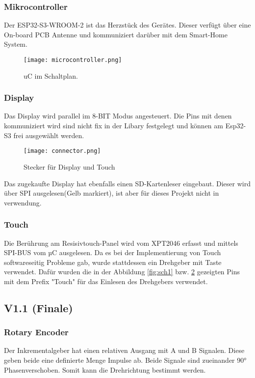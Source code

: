         \newpage

        \subsubsection{Mikrocontroller}
        Der ESP32-S3-WROOM-2 ist das Herzstück des Gerätes. Dieser verfügt über eine On-board PCB Antenne
        und kommuniziert darüber mit dem Smart-Home System. 

            \begin{figure}[h!]
                \centering
                \texttt{[image: microcontroller.png]}
                \caption{uC im Schaltplan.}
                \label{fig:sch3}

            \end{figure}

        \subsubsection{Display}
        Das Display wird parallel im 8-BIT Modus angesteuert. Die Pins mit denen 
        kommuniziert wird sind nicht fix in der Libary festgelegt und können am Esp32-S3 
        frei ausgewählt werden. 

            \begin{figure}[h!]
                \centering
                \texttt{[image: connector.png]}
                \caption{Stecker für Display und Touch}
                \label{fig:sch4}

            \end{figure}

        Das zugekaufte Display hat ebenfalls einen SD-Kartenleser eingebaut. Dieser wird 
        über SPI ausgelesen(Gelb markiert), ist aber für dieses Projekt nicht in verwendung. 


        \subsubsection{Touch}
        Die Berührung am Resisivtouch-Panel wird vom XPT2046 erfasst und mittels 
        SPI-BUS vom µC ausgelesen. Da es bei der Implementierung von Touch softwareseitig
        Probleme gab, wurde stattdessen ein Drehgeber mit Taste verwendet.
        Dafür wurden die in der Abbildung \ref{fig:sch1} bzw. \ref{fig:sch4} gezeigten Pins mit 
        dem Prefix "Touch" für das Einlesen des Drehgebers verwendet.

 

    \subsection{V1.1 (Finale)}        
        
    \subsubsection{Rotary Encoder}
        Der Inkrementalgeber hat einen relativen Ausgang mit A und B Signalen. Diese geben beide
        eine definierte Menge Impulse ab. Beide Signale sind zueinander 90° Phasenverschoben. Somit
        kann die Drehrichtung bestimmt werden.